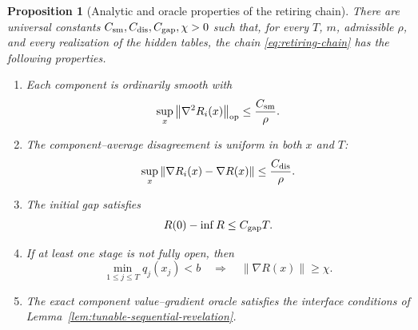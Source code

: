 \documentclass[11pt,a4paper]{article}
\newcommand{\norm}[1]{\left\lVert #1\right\rVert}
\newtheorem{proposition}[theorem]{Proposition}
\theoremstyle{remark}
\begin{document}
\begin{proposition}[Analytic and oracle properties of the retiring chain]
\label{prop:retiring-chain-properties}
There are universal constants $C_{\rm sm},C_{\rm dis},C_{\rm gap},\chi>0$
such that, for every $T$, $m$, admissible $\rho$, and every realization of
the hidden tables, the chain \eqref{eq:retiring-chain} has the following
properties.
\begin{enumerate}
\item Each component is ordinarily smooth with
\begin{equation}
 \sup_x\norm{\nabla^2R_i(x)}_{\rm op}\le\frac{C_{\rm sm}}\rho.
 \label{eq:retiring-smoothness}
\end{equation}
\item The component--average disagreement is uniform in both $x$ and $T$:
\begin{equation}
 \sup_x\norm{\nabla R_i(x)-\nabla R(x)}
 \le\frac{C_{\rm dis}}\rho.
 \label{eq:retiring-disagreement}
\end{equation}
\item The initial gap satisfies
\begin{equation}
 R(0)-\inf R\le C_{\rm gap}T.
 \label{eq:retiring-gap}
\end{equation}
\item If at least one stage is not fully open, then
\begin{equation}
 \min_{1\le j\le T}q_j(x_j)<b
 \quad\Longrightarrow\quad
 \norm{\nabla R(x)}\ge\chi.
 \label{eq:retiring-gradient-lower}
\end{equation}
\item The exact component value--gradient oracle satisfies the
interface conditions of Lemma~\ref{lem:tunable-sequential-revelation}.
\end{enumerate}
\end{proposition}
\end{document}
